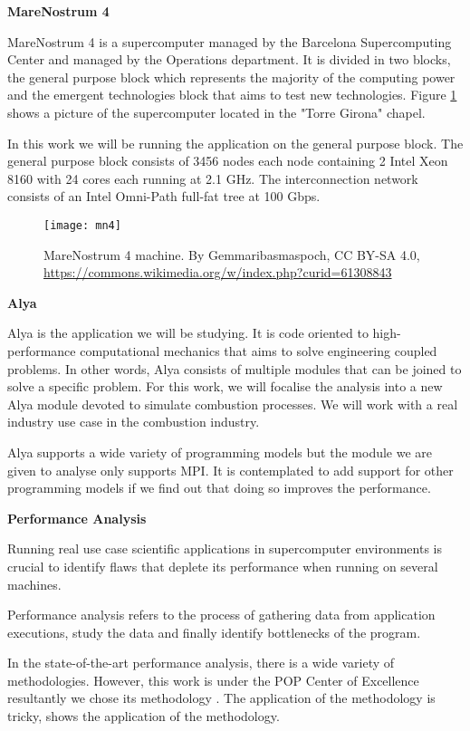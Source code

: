 \textbf{MareNostrum 4}

MareNostrum 4 \cite{mn4} is a supercomputer managed by the Barcelona Supercomputing Center and managed by the Operations department. It is divided in two blocks, the general purpose block which represents the majority of the computing power and the emergent technologies block that aims to test new technologies. Figure \ref{fig:mn4} shows a picture of the supercomputer located in the "Torre Girona" chapel.

In this work we will be running the application on the general purpose block.
The general purpose block consists of 3456 nodes each node containing 2 Intel Xeon 8160 with 24 cores each running at 2.1 GHz. The interconnection network consists of an Intel Omni-Path full-fat tree at 100 Gbps.

\begin{figure}[htbp]
  \centering
  \texttt{[image: mn4]}
  \caption[MareNostrum4 machine]{MareNostrum 4 machine. {By Gemmaribasmaspoch, CC BY-SA 4.0, \url{https://commons.wikimedia.org/w/index.php?curid=61308843}}}
  \label{fig:mn4}
\end{figure}

\textbf{Alya}

Alya \cite{alya} is the application we will be studying.  It is code oriented to high-performance computational mechanics that aims to solve engineering coupled problems. In other words, Alya consists of multiple modules that can be joined to solve a specific problem. For this work, we will focalise the analysis into a new Alya module devoted to simulate combustion processes. We will work with a real industry use case in the combustion industry.

Alya supports a wide variety of programming models but the module we are given to analyse only supports MPI. It is contemplated to add support for other programming models if we find out that doing so improves the performance.

\textbf{Performance Analysis}

Running real use case scientific applications in supercomputer environments is crucial to identify flaws that deplete its performance when running on several machines.

Performance analysis refers to the process of gathering data from application executions, study the data and finally identify bottlenecks of the program.

In the state-of-the-art performance analysis, there is a wide variety of methodologies. However, this work is under the POP Center of Excellence resultantly we chose its methodology  \cite{popMethod}. The application of the methodology is tricky,  \cite{paperparaver} shows the application of the methodology.

